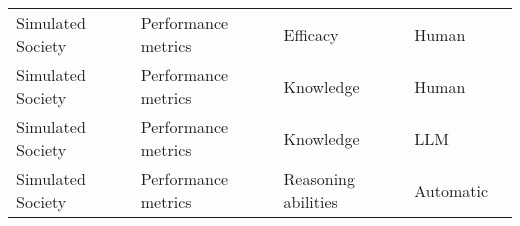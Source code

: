 \begin{small}
\begin{center}
\begin{longtable}{@{}p{}p{}p{}p{}p{}@{}}
Simulated Society        & Performance metrics                 & Efficacy                                                                                                                                                                                                    & Human     & \cite{ashkinaze2024pluralsguidingllmssimulated}                                                                                                                                                                                                                                                                                                                                                                                              \\
Simulated Society        & Performance metrics                 & Knowledge                                                                                                                                                                                                   & Human     & \cite{zhou2024sotopiainteractiveevaluationsocial}                                                                                                                                                                                                                                                                                                                                                                                              \\
Simulated Society        & Performance metrics                 & Knowledge                                                                                                                                                                                                   & LLM       & \cite{zhou2024sotopiainteractiveevaluationsocial}                                                                                                                                                                                                                                                                                                                                                                                              \\
Simulated Society        & Performance metrics                 & Reasoning abilities                                                                                                                                                                                         & Automatic & \cite{chen2023agentversefacilitatingmultiagentcollaboration}                                                                                                                                                                                                                                                                                                                                                                                                 \\

\end{longtable}
\end{center}
\end{small}
